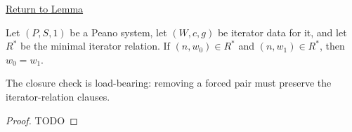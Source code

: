 \newpage
{}
\label{prf:forced-values-are-unique}

\begin{remark*}[Return]
\hyperref[lem:forced-values-are-unique]{Return to Lemma}
\end{remark*}

\begin{theorem*}
Let $(P,S,1)$ be a Peano system, let $(W,c,g)$ be iterator data for it, and let
$R^*$ be the minimal iterator relation. If $(n,w_0)\in R^*$ and
$(n,w_1)\in R^*$, then $w_0=w_1$.
\end{theorem*}

\begin{remark*}
The closure check is load-bearing: removing a forced pair must preserve the
iterator-relation clauses.
\end{remark*}

\begin{proof}
TODO
\end{proof}
